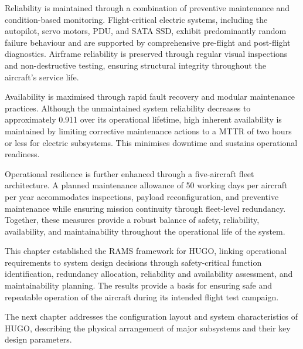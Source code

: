 Reliability is maintained through a combination of preventive maintenance and condition-based monitoring. Flight-critical electric systems, including the autopilot, servo motors, PDU, and SATA SSD, exhibit predominantly random failure behaviour and are supported by comprehensive pre-flight and post-flight diagnostics. Airframe reliability is preserved through regular visual inspections and non-destructive testing, ensuring structural integrity throughout the aircraft's service life.

Availability is maximised through rapid fault recovery and modular maintenance practices. Although the unmaintained system reliability decreases to approximately 0.911 over its operational lifetime, high inherent availability is maintained by limiting corrective maintenance actions to a MTTR of two hours or less for electric subsystems. This minimises downtime and sustains operational readiness.

Operational resilience is further enhanced through a five-aircraft fleet architecture. A planned maintenance allowance of 50 working days per aircraft per year accommodates inspections, payload reconfiguration, and preventive maintenance while ensuring mission continuity through fleet-level redundancy. Together, these measures provide a robust balance of safety, reliability, availability, and maintainability throughout the operational life of the system.


This chapter established the RAMS framework for HUGO, linking operational requirements to system design decisions through safety-critical function identification, redundancy allocation, reliability and availability assessment, and maintainability planning. The results provide a basis for ensuring safe and repeatable operation of the aircraft during its intended flight test campaign.

The next chapter addresses the configuration layout and system characteristics of HUGO, describing the physical arrangement of major subsystems and their key design parameters.